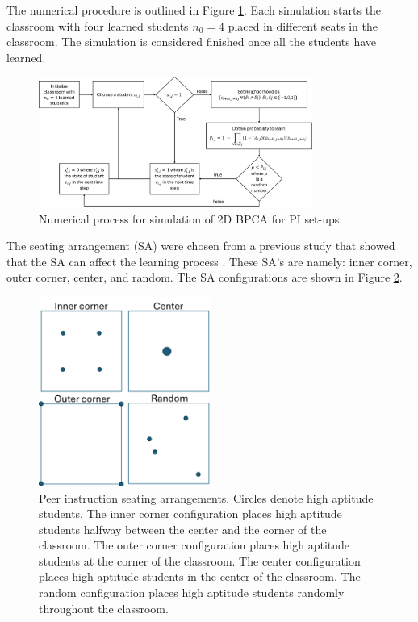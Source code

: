 The numerical procedure is outlined in Figure \ref{fig:2DBPCA PI Flowchart}. Each simulation starts the classroom with four learned students $n_0 = 4$ placed in different seats in the classroom. The simulation is considered finished once all the students have learned.

\begin{figure}[htbp!]
    \centering
    \includegraphics[width=0.8\textwidth]{figures/2DBPCA PI Flowchart.png}
    \caption[Peer instruction flowchart]{Numerical process for simulation of 2D BPCA for PI set-ups.}
    \label{fig:2DBPCA PI Flowchart}
\end{figure}

The seating arrangement (SA) were chosen from a previous study that showed that the SA can affect the learning process \cite{roxas2010seating}. These SA's are namely: inner corner, outer corner, center, and random. The SA configurations are shown in Figure \ref{fig:PI SAs}.

 \begin{figure}[htbp!]
    \centering
    \includegraphics[width=0.5\textwidth]{figures/PI SAs.png}
    \caption[Peer instruction seating arrangements.]{ Peer instruction seating arrangements. Circles denote high aptitude students. The inner corner configuration places high aptitude students halfway between the center and the corner of the classroom. The outer corner configuration places high aptitude students at the corner of the classroom. The center configuration places high aptitude students in the center of the classroom. The random configuration places high aptitude students randomly throughout the classroom.}
    \label{fig:PI SAs}
 \end{figure}

